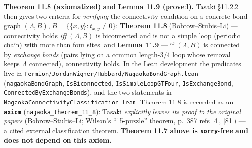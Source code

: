 \documentclass[a4paper,11pt]{article}
\begin{document}
\medskip
\noindent\textbf{Theorem 11.8 (axiomatized) and Lemma 11.9 (proved).}
Tasaki §11.2.2 then gives two criteria for \emph{verifying} the connectivity
condition on a concrete bond graph \((\Lambda, B)\), \(B = \{\{x,y\} : t_{x,y}
\ne 0\}\): \textbf{Theorem 11.8} (Bobrow--Stubis--Li) — connectivity holds
\emph{iff} \((\Lambda, B)\) is biconnected and is not a simple loop (periodic
chain) with more than four sites; and \textbf{Lemma 11.9} — if \((\Lambda, B)\)
is connected by \emph{exchange bonds} (pairs lying on a common length-3/4 loop
whose removal keeps \(\Lambda\) connected), connectivity holds. In the Lean
development the predicates live in
\texttt{Fermion/JordanWigner/Hubbard/NagaokaBondGraph.lean}
(\texttt{nagaokaBondGraph}, \texttt{IsBiconnected}, \texttt{IsSimpleLoopGTFour},
\texttt{IsExchangeBond}, \texttt{ConnectedByExchangeBonds}), and the two
statements in \texttt{NagaokaConnectivityClassification.lean}. Theorem 11.8 is
recorded as an \textbf{\texttt{axiom}} (\texttt{nagaoka\_theorem\_11\_8}):
Tasaki \emph{explicitly leaves its proof to the original papers}
(Bobrow--Stubis--Li; Wilson's ``15-puzzle'' theorem, p.~387 refs [4], [81]) — a
cited external classification theorem. \textbf{Theorem 11.7 above is
\texttt{sorry}-free and does not depend on this axiom.}
\end{document}
